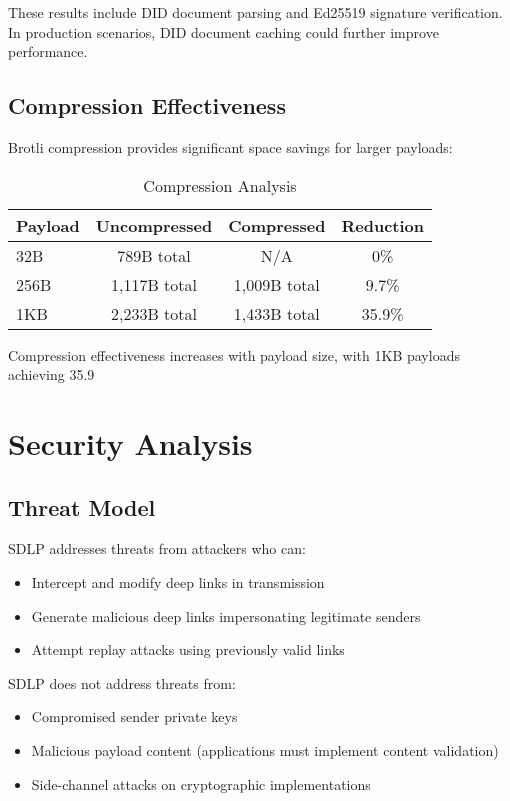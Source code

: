 \documentclass[conference]{IEEEtran}
\begin{document}
These results include DID document parsing and Ed25519 signature verification. In production scenarios, DID document caching could further improve performance.

\subsection{Compression Effectiveness}

Brotli compression provides significant space savings for larger payloads:

\begin{table}[!t]
\caption{Compression Analysis}
\label{tab:compression}
\centering
\begin{tabular}{@{}lccc@{}}
\toprule
Payload & Uncompressed & Compressed & Reduction \\
\midrule
32B & 789B total & N/A & 0\% \\
256B & 1,117B total & 1,009B total & 9.7\% \\
1KB & 2,233B total & 1,433B total & 35.9\% \\
\bottomrule
\end{tabular}
\end{table}

Compression effectiveness increases with payload size, with 1KB payloads achieving 35.9%

\section{Security Analysis}

\subsection{Threat Model}

SDLP addresses threats from attackers who can:
\begin{itemize}
    \item Intercept and modify deep links in transmission
    \item Generate malicious deep links impersonating legitimate senders
    \item Attempt replay attacks using previously valid links
\end{itemize}

SDLP does not address threats from:
\begin{itemize}
    \item Compromised sender private keys
    \item Malicious payload content (applications must implement content validation)
    \item Side-channel attacks on cryptographic implementations
\end{itemize}
\end{document}

